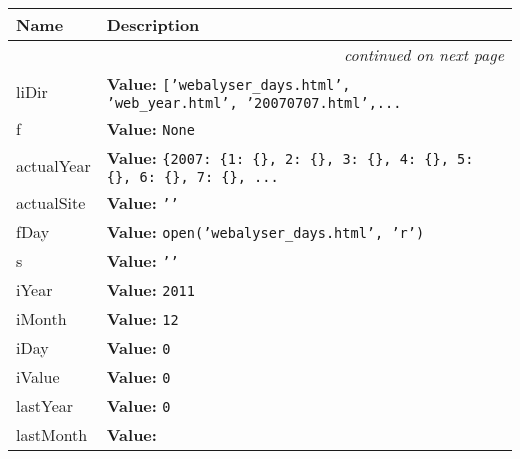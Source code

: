     \vspace{-1cm}
\hspace{\varindent}\begin{longtable}{|p{\varnamewidth}|p{\vardescrwidth}|l}
\cline{1-2}
\cline{1-2} \centering \textbf{Name} & \centering \textbf{Description}& \\
\cline{1-2}
\endhead\cline{1-2}\multicolumn{3}{r}{\small\textit{continued on next page}}\\\endfoot\cline{1-2}
\endlastfoot\raggedright l\-i\-D\-i\-r\- & \raggedright \textbf{Value:} 
{\tt \texttt{[}\texttt{'}\texttt{webalyser\_days.html}\texttt{'}\texttt{, }\texttt{'}\texttt{web\_year.html}\texttt{'}\texttt{, }\texttt{'}\texttt{20070707.html}\texttt{'}\texttt{,}\texttt{...}}&\\
\cline{1-2}
\raggedright f\- & \raggedright \textbf{Value:} 
{\tt None}&\\
\cline{1-2}
\raggedright a\-c\-t\-u\-a\-l\-Y\-e\-a\-r\- & \raggedright \textbf{Value:} 
{\tt \texttt{\{}2007\texttt{: }\texttt{\{}1\texttt{: }\texttt{\{}\texttt{\}}\texttt{, }2\texttt{: }\texttt{\{}\texttt{\}}\texttt{, }3\texttt{: }\texttt{\{}\texttt{\}}\texttt{, }4\texttt{: }\texttt{\{}\texttt{\}}\texttt{, }5\texttt{: }\texttt{\{}\texttt{\}}\texttt{, }6\texttt{: }\texttt{\{}\texttt{\}}\texttt{, }7\texttt{: }\texttt{\{}\texttt{\}}\texttt{, }\texttt{...}}&\\
\cline{1-2}
\raggedright a\-c\-t\-u\-a\-l\-S\-i\-t\-e\- & \raggedright \textbf{Value:} 
{\tt \texttt{'}\texttt{}\texttt{'}}&\\
\cline{1-2}
\raggedright f\-D\-a\-y\- & \raggedright \textbf{Value:} 
{\tt open('webalyser\_days.html', 'r')}&\\
\cline{1-2}
\raggedright s\- & \raggedright \textbf{Value:} 
{\tt \texttt{'}\texttt{}\texttt{'}}&\\
\cline{1-2}
\raggedright i\-Y\-e\-a\-r\- & \raggedright \textbf{Value:} 
{\tt 2011}&\\
\cline{1-2}
\raggedright i\-M\-o\-n\-t\-h\- & \raggedright \textbf{Value:} 
{\tt 12}&\\
\cline{1-2}
\raggedright i\-D\-a\-y\- & \raggedright \textbf{Value:} 
{\tt 0}&\\
\cline{1-2}
\raggedright i\-V\-a\-l\-u\-e\- & \raggedright \textbf{Value:} 
{\tt 0}&\\
\cline{1-2}
\raggedright l\-a\-s\-t\-Y\-e\-a\-r\- & \raggedright \textbf{Value:} 
{\tt 0}&\\
\cline{1-2}
\raggedright l\-a\-s\-t\-M\-o\-n\-t\-h\- & \raggedright \textbf{Value:} 

\end{longtable}
